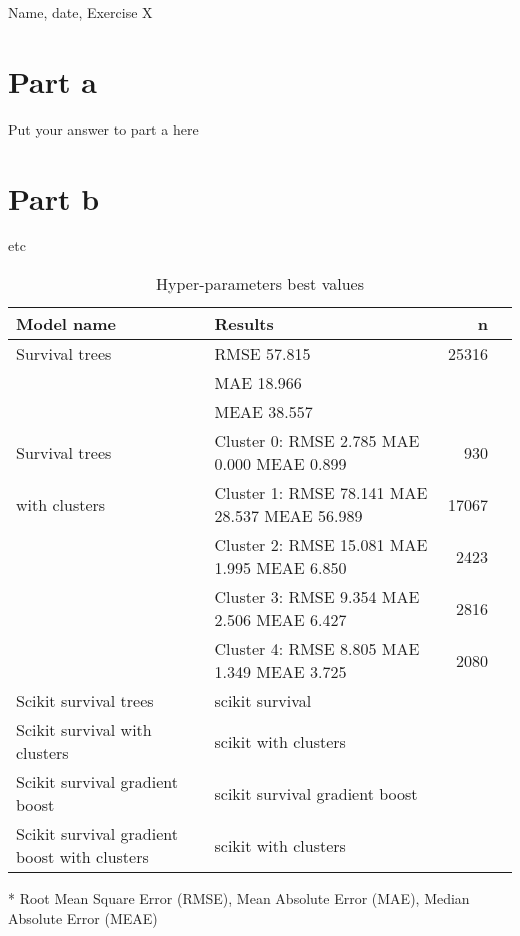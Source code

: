 \documentclass{article}
\begin{document}
Name, date, Exercise X

\section*{Part a}

Put your answer to part a here

\section*{Part b}

etc

\begin{table}[ht]
    \footnotesize
    \centering
    \begin{tabular}{p{}p{}r p{}}
    \hline
    \textbf{Model name} & \textbf{Results} & \textbf{n}\\
    \hline
    Survival trees  & RMSE 57.815                                     & 25316\\
                    & MAE 18.966                                      & \\   
                    & MEAE 38.557                                     & \\
    Survival trees  & Cluster 0: RMSE  2.785 MAE  0.000 MEAE  0.899   &   930\\
    with clusters   & Cluster 1: RMSE 78.141 MAE 28.537 MEAE 56.989   & 17067\\
                    & Cluster 2: RMSE 15.081 MAE  1.995 MEAE  6.850   &  2423\\
                    & Cluster 3: RMSE  9.354 MAE  2.506 MEAE  6.427   &  2816\\
                    & Cluster 4: RMSE  8.805 MAE  1.349 MEAE  3.725   &  2080\\
                    
    Scikit survival 
    trees           & scikit survival                                 & \\
    Scikit survival 
    with clusters   & scikit with clusters                            & \\
    Scikit survival 
    gradient boost  & scikit survival gradient boost                  & \\
    Scikit survival 
    gradient boost 
    with clusters   & scikit with clusters                            & \\
    \hline
    \end{tabular}
    \caption{Hyper-parameters best values}
    \label{hyperparametersbestvalues}
    * Root Mean Square Error (RMSE), Mean Absolute Error (MAE), Median Absolute Error (MEAE)  
\end{table}
\end{document}
